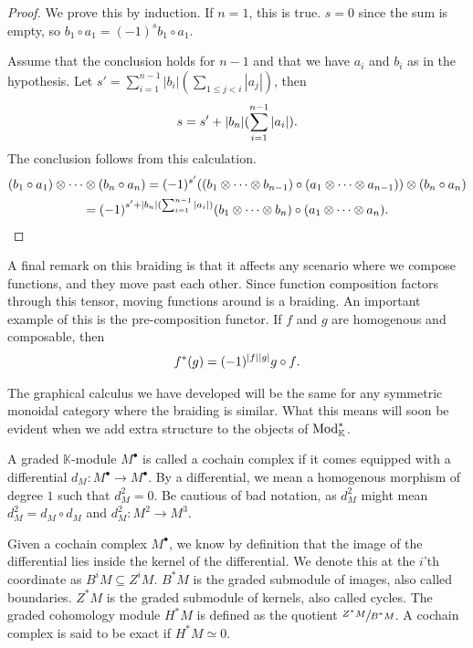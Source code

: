 \documentclass[../thesis.tex]{subfiles}
\begin{document}
            \begin{proof}
                We prove this by induction. If $n=1$, this is true. $s = 0$ since the sum is empty, so $b_1 \circ a_1  =(-1)^s b_1 \circ a_1$.
                
                Assume that the conclusion holds for $n - 1$ and that we have $a_i$ and $b_i$ as in the hypothesis. Let $s' = \sum_{i=1}^{n-1}|b_i|(\sum_{1\leq j < i}|a_j|)$, then
                \begin{align*}
                    s = s' + |b_n|(\sum_{i = 1}^{n-1}|a_i|)\tt{.}
                \end{align*}
                The conclusion follows from this calculation.
                \begin{multline*}
                    (b_1 \circ a_1) \otimes \cdots \otimes (b_n \circ a_n) = (-1)^{s'}((b_1 \otimes \cdots \otimes b_{n-1}) \circ (a_1 \otimes \cdots \otimes a_{n-1})) \otimes (b_n \circ a_n) \\ = (-1)^{s' + |b_n|(\sum_{i = 1}^{n-1}|a_i|)}(b_1 \otimes \cdots \otimes b_n) \circ (a_1 \otimes \cdots \otimes a_n)\tt{.}
                \end{multline*}
            \end{proof}

            A final remark on this braiding is that it affects any scenario where we compose functions, and they move past each other. Since function composition factors through this tensor, moving functions around is a braiding. An important example of this is the pre-composition functor. If $f$ and $g$ are homogenous and composable, then
            \begin{align*}
                f^*(g) = (-1)^{|f||g|}g\circ f\tt{.}
            \end{align*}

            The graphical calculus we have developed will be the same for any symmetric monoidal category where the braiding is similar. What this means will soon be evident when we add extra structure to the objects of $\tt{Mod}_\mathbb{K}^*$.

            A graded $\mathbb{K}$-module $M^\bullet$ is called a cochain complex if it comes equipped with a differential $d_M: M^\bullet \rightarrow M^\bullet$. By a differential, we mean a homogenous morphism of degree $1$ such that $d_M^2 = 0$. Be cautious of bad notation, as $d^2_M$ might mean $d^2_M = d_M \circ d_M$ and $d^2_M : M^2 \rightarrow M^3$.

            Given a cochain complex $M^\bullet$, we know by definition that the image of the differential lies inside the kernel of the differential. We denote this at the $i$'th coordinate as $B^iM \subseteq Z^iM$. $B^*M$ is the graded submodule of images, also called boundaries. $Z^*M$ is the graded submodule of kernels, also called cycles. The graded cohomology module $H^*M$ is defined as the quotient $\sfrac{Z^*M}{B^*M}$. A cochain complex is said to be exact if $H^*M \simeq 0$.
\end{document}
